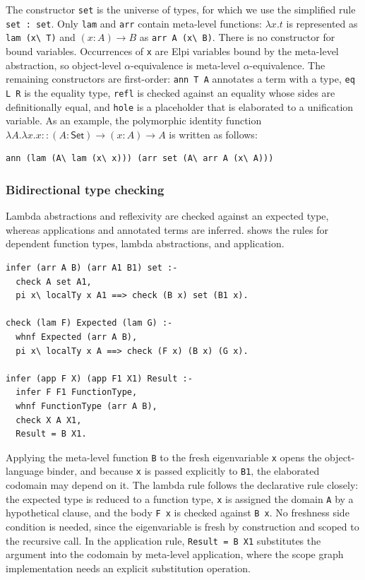 The constructor \lstinline|set| is the universe of types, for which we use the
simplified rule \lstinline|set : set|. Only \lstinline|lam| and \lstinline|arr|
contain meta-level functions: $\lambda x.t$ is represented as
\lstinline|lam (x\ T)| and $(x : A) \to B$ as \lstinline|arr A (x\ B)|. There is
no constructor for bound variables. Occurrences of \lstinline|x| are Elpi
variables bound by the meta-level abstraction, so object-level
$\alpha$-equivalence is meta-level $\alpha$-equivalence. The remaining
constructors are first-order: \lstinline|ann T A| annotates a term with a type,
\lstinline|eq L R| is the equality type, \lstinline|refl| is checked against an
equality whose sides are definitionally equal, and \lstinline|hole| is a
placeholder that is elaborated to a unification variable. As an example, the polymorphic identity function $\lambda A.\lambda x.x :: (A : \mathsf{Set}) \to (x : A) \to A$ is written as follows:

\begin{lstlisting}[language=Elpi, caption={The polymorphic identity function in HOAS},
label={lst:elpi-identity}]
ann (lam (A\ lam (x\ x))) (arr set (A\ arr A (x\ A)))
\end{lstlisting}

\subsubsection{Bidirectional type checking}

Lambda abstractions and reflexivity are checked against an expected type,
whereas applications and annotated terms are inferred.
 shows the rules for dependent function types, lambda
abstractions, and application.

\begin{lstlisting}[language=Elpi, caption={Typing rules for binders and application},
label={lst:elpi-rules}]
infer (arr A B) (arr A1 B1) set :-
  check A set A1,
  pi x\ localTy x A1 ==> check (B x) set (B1 x).

check (lam F) Expected (lam G) :-
  whnf Expected (arr A B),
  pi x\ localTy x A ==> check (F x) (B x) (G x).

infer (app F X) (app F1 X1) Result :-
  infer F F1 FunctionType,
  whnf FunctionType (arr A B),
  check X A X1,
  Result = B X1.
\end{lstlisting}

Applying the meta-level function \lstinline|B| to the fresh eigenvariable
\lstinline|x| opens the object-language binder, and because \lstinline|x| is
passed explicitly to \lstinline|B1|, the elaborated codomain may depend on it.
The lambda rule follows the declarative rule closely: the expected type is
reduced to a function type, \lstinline|x| is assigned the domain \lstinline|A|
by a hypothetical clause, and the body \lstinline|F x| is checked against
\lstinline|B x|. No freshness side condition is needed, since the eigenvariable
is fresh by construction and scoped to the recursive call. In the application
rule, \lstinline|Result = B X1| substitutes the argument into the codomain by
meta-level application, where the scope graph implementation needs an explicit
substitution operation.

